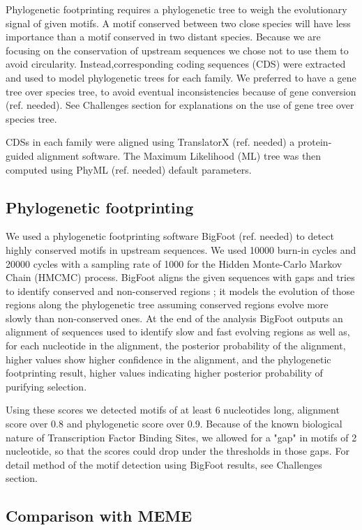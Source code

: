 Phylogenetic footprinting requires a phylogenetic tree to weigh the evolutionary signal of given motifs. A motif conserved between two close species will have less importance than a motif conserved in two distant species. Because we are focusing on the conservation of upstream sequences we chose not to use them to avoid circularity. Instead,corresponding coding sequences (CDS) were extracted and used to model phylogenetic trees for each family. We preferred to have a gene tree over species tree, to avoid eventual inconsistencies because of gene conversion (ref. needed). See Challenges section for explanations on the use of gene tree over species tree.

CDSs in each family were aligned using TranslatorX (ref. needed) a protein-guided alignment software. The Maximum Likelihood (ML) tree was then computed using PhyML (ref. needed) default parameters.

\subsection*{Phylogenetic footprinting}

We used a phylogenetic footprinting software BigFoot (ref. needed) to detect highly conserved motifs in upstream sequences. We used 10000 burn-in cycles and 20000 cycles with a sampling rate of 1000 for the Hidden Monte-Carlo Markov Chain (HMCMC) process. BigFoot aligns the given sequences with gaps and tries to identify conserved and non-conserved regions ; it models the evolution of those regions along the phylogenetic tree assuming conserved regions evolve more slowly than non-conserved ones. At the end of the analysis BigFoot outputs an alignment of sequences used to identify slow and fast evolving regions as well as, for each nucleotide in the alignment, the posterior probability of the alignment, higher values show higher confidence in the alignment, and the phylogenetic footprinting result, higher values indicating higher posterior probability of purifying selection.

Using these scores we detected motifs of at least 6 nucleotides long, alignment score over 0.8 and phylogenetic score over 0.9. Because of the known biological nature of Transcription Factor Binding Sites, we allowed for a "gap" in motifs of 2 nucleotide, so that the scores could drop under the thresholds in those gaps. For detail method of the motif detection using BigFoot results, see Challenges section.

\subsection*{Comparison with MEME}

